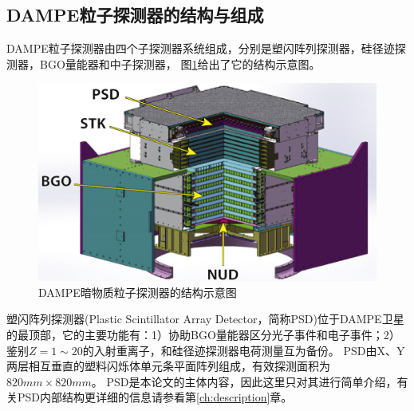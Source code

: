 \subsection{DAMPE粒子探测器的结构与组成}
DAMPE粒子探测器由四个子探测器系统组成，分别是塑闪阵列探测器，硅径迹探测器，BGO量能器和中子探测器，
图\ref{fig:introduction:dampe_structure}给出了它的结构示意图。
\begin{figure}[htb]
	\centering
	\includegraphics[width=0.8\linewidth]{chap/introduction/fig/dampe_structure}
	\caption{DAMPE暗物质粒子探测器的结构示意图}
	\label{fig:introduction:dampe_structure}
\end{figure}


塑闪阵列探测器(Plastic Scintillator Array Detector，简称PSD)位于DAMPE卫星的最顶部，它的主要功能有：1）协助BGO量能器区分光子事件和电子事件；2）鉴别$Z=1\sim 20$的入射重离子，和硅径迹探测器电荷测量互为备份。
PSD由X、Y两层相互垂直的塑料闪烁体单元条平面阵列组成，有效探测面积为$820mm\times 820mm$。
PSD是本论文的主体内容，因此这里只对其进行简单介绍，有关PSD内部结构更详细的信息请参看第\ref{ch:description}章。

